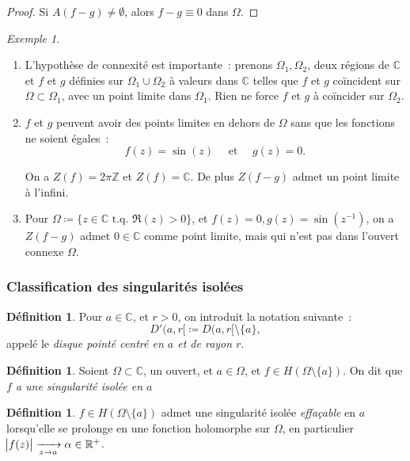 \documentclass{report}
\theoremstyle{definition}
\newtheorem{déf}[thm]{Définition}
\theoremstyle{remark}
\newtheorem{ex}{Exemple}[chapter]
\numberwithin{equation}{section}
\newcommand{\C}{\mathbb C}
\newcommand{\R}{\mathbb R}
\newcommand{\Z}{\mathbb Z}
\newcommand{\tq}{\text{ t.q. }}
\begin{document}
			\begin{proof} Si $A(f-g) \neq \emptyset$, alors $f-g \equiv 0$ dans $\Omega$.
			\end{proof}

			\begin{ex}~
			\begin{enumerate}
				\item L'hypothèse de connexité est importante~: prenons $\Omega_1, \Omega_2$, deux régions de $\C$ et $f$ et $g$ définies sur $\Omega_1 \cup \Omega_2$
				à valeurs dans $\C$ telles que $f$ et $g$ coïncident sur $\Omega \subset \Omega_1$, avec un point limite dans $\Omega_1$. Rien ne force $f$ et $g$ à
				coïncider sur $\Omega_2$.
				\item $f$ et $g$ peuvent avoir des points limites en dehors de $\Omega$ sans que les fonctions ne soient égales~:
				\begin{equation}
					f(z) = \sin(z) \quad \text{ et } \quad g(z) = 0.
				\end{equation}

				On a $Z(f) = 2\pi\Z$ et $Z(f) = \C$. De plus $Z(f-g)$ admet un point limite à l'infini.
				\item Pour $\Omega \coloneqq \{z \in \C \tq \Re(z) > 0\}$, et $f(z) = 0, g(z) = \sin(z^{-1})$, on a $Z(f-g)$ admet $0 \in \C$ comme point limite, mais qui
				n'est pas dans l'ouvert connexe $\Omega$.
			\end{enumerate}
			\end{ex}

		\subsubsection{Classification des singularités isolées}
			\begin{déf}
				Pour $a \in \C$, et $r > 0$, on introduit la notation suivante~:
				\begin{equation}
					D'(a, r[ \coloneqq D(a, r[ \setminus \{a\},
				\end{equation}
				appelé le \textit{disque pointé centré en $a$ et de rayon $r$}.
			\end{déf}

			\begin{déf} Soient $\Omega \subset \C$, un ouvert, et $a \in \Omega$, et $f \in H(\Omega \setminus \{a\})$. On dit que
			\textit{$f$ a une singularité isolée en $a$}
			\end{déf}

			\begin{déf} $f \in H(\Omega \setminus \{a\})$ admet une singularité isolée \textit{effaçable} en $a$ lorsqu'elle se prolonge en une fonction holomorphe
			sur $\Omega$, en particulier $\abs {f(z)} \xrightarrow[z \to a]{} \alpha \in \R^+$.
			\end{déf}
\end{document}
